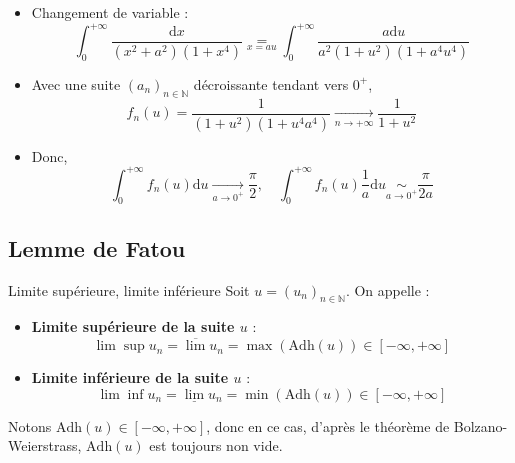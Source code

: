 \begin{myproof}{}{}
\begin{itemize}

    \item Changement de variable : 
      \begin{equation}
        \int_{0}^{+ \infty} \frac{\mathrm{d}x}{(x ^{2}+a ^{2})(1+ x ^{4})}  \underset{x = au}{=} \int_{0}^{+\infty} \frac{a \mathrm{d}u}{a ^{2}(1 + u ^{2})(1+ a ^{4} u ^{4})} 
      \end{equation}

    \item Avec une suite $(a_n) _{n \in \mathbb{N}}$ décroissante tendant vers $0 ^{+}$, 
      \begin{equation}
        f_n(u) = \frac{1}{(1+u ^{2})(1+ u ^{4}a ^{4})}  \underset{n \to + \infty}{\longrightarrow} \frac{1}{1+ u ^{2}}  
      \end{equation}

    \item Donc, 
      \begin{equation}
        \int_{0}^{+ \infty} f_n(u) \mathrm{d}u  \underset{a \to 0 ^{+}}{\longrightarrow} \frac{\pi}{2},\quad
         \int_{0}^{+ \infty} f_n(u) \frac{1}{a}\mathrm{d}u  \underset{a \to 0 ^{+}}{\sim} \frac{\pi}{2a}
      \end{equation}

\end{itemize}
\end{myproof}







\subsection{Lemme de Fatou} %
\label{sub:Lemme de Fatou}

\begin{Definition}[colbacktitle=red!75!black]{Limite supérieure, limite inférieure}{}
Soit $u = (u _n ) _{n \in \mathbb{N}}$. On appelle : 
\begin{itemize}

    \item \textbf{Limite supérieure de la suite $u$} : 
      \begin{equation}
        \lim \sup u_n = \overline{\lim} u_n = \max (\mathrm{Adh}(u)) \in [-\infty, + \infty]
      \end{equation}

    \item \textbf{Limite inférieure de la suite $u$} : 
      \begin{equation}
        \lim \inf u_n = \underline{\lim} u_n = \min (\mathrm{Adh}(u)) \in [-\infty, + \infty]
      \end{equation}

    

\end{itemize}

Notons $\mathrm{Adh}(u) \in [-\infty, +\infty]$, donc en ce cas, d'après le théorème de Bolzano-Weierstrass, $\mathrm{Adh}(u)$ est toujours non vide.
\end{Definition}

